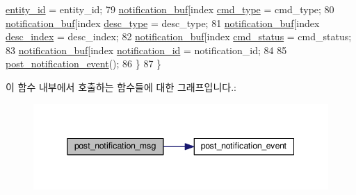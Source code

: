 \begin{DoxyCode}
      \hyperlink{structavdecc__lib_1_1notification_1_1notification__data_af62ee4e75fffd2fbb80f324b5cbcddaa}{entity\_id} = entity\_id;
79         \hyperlink{classavdecc__lib_1_1notification_a87642905af524dd0472d4646f3cea881}{notification\_buf}[index %
      \hyperlink{structavdecc__lib_1_1notification_1_1notification__data_a3bce0b5ba2f67f9b7e6af3cf5903bad2}{cmd\_type} = cmd\_type;
80         \hyperlink{classavdecc__lib_1_1notification_a87642905af524dd0472d4646f3cea881}{notification\_buf}[index %
      \hyperlink{structavdecc__lib_1_1notification_1_1notification__data_a9dada313309522d04f1e52fe887442b4}{desc\_type} = desc\_type;
81         \hyperlink{classavdecc__lib_1_1notification_a87642905af524dd0472d4646f3cea881}{notification\_buf}[index %
      \hyperlink{structavdecc__lib_1_1notification_1_1notification__data_a2bbd0d8f32f687ca36aaa543c06f764c}{desc\_index} = desc\_index;
82         \hyperlink{classavdecc__lib_1_1notification_a87642905af524dd0472d4646f3cea881}{notification\_buf}[index %
      \hyperlink{structavdecc__lib_1_1notification_1_1notification__data_a4ee5fdad0d413ea837e5ecfd71495848}{cmd\_status} = cmd\_status;
83         \hyperlink{classavdecc__lib_1_1notification_a87642905af524dd0472d4646f3cea881}{notification\_buf}[index %
      \hyperlink{structavdecc__lib_1_1notification_1_1notification__data_a1efd7ce38af0ff90ffefd52133214023}{notification\_id} = notification\_id;
84 
85         \hyperlink{classavdecc__lib_1_1notification_ac5cb485393e5d7e2ff19e7ee8945a0bd}{post\_notification\_event}();
86     \}
87 \}
\end{DoxyCode}


이 함수 내부에서 호출하는 함수들에 대한 그래프입니다.\+:
\nopagebreak
\begin{figure}[H]
\begin{center}
\leavevmode
\includegraphics[width=345pt]{classavdecc__lib_1_1notification_a2775ca78354ea78d68bf107c084b3822_cgraph}
\end{center}
\end{figure}




